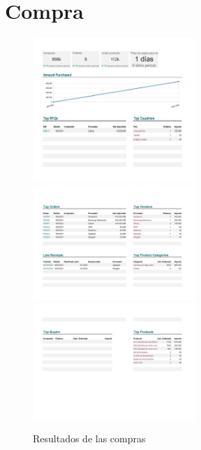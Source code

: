 \documentclass{report}
\begin{document}
        \section*{Compra}
            \begin{figure}[H]
                \centering
                \includegraphics[width=0.55\textwidth]{./img/Compra1.png}
                \includegraphics[width=0.55\textwidth]{./img/Compra2.png}
                \includegraphics[width=0.55\textwidth]{./img/Compra3.png}
                \caption{Resultados de las compras}
            \end{figure}
\end{document}

